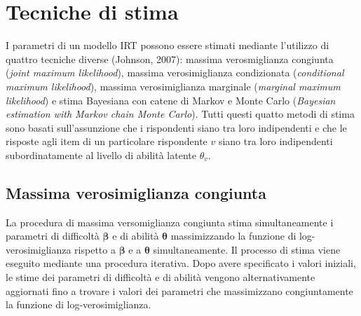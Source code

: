 

\section{Tecniche di stima}

I parametri di un modello IRT possono essere stimati mediante l'utilizzo di quattro tecniche diverse (Johnson, 2007): massima verosmiglianza congiunta ({\it joint maximum likelihood}), massima verosimiglianza condizionata ({\it conditional maximum likelihood}), massima verosimiglianza marginale ({\it marginal maximum likelihood}) e stima Bayesiana con catene di Markov e Monte Carlo ({\it Bayesian estimation with Markov chain Monte Carlo}).  Tutti questi quatto metodi di stima sono basati sull'assunzione che i rispondenti siano tra loro indipendenti e che le risposte agli item di un particolare rispondente $v$ siano tra loro indipendenti subordinatamente al livello di abilità latente $\theta_v$. 

\subsection{Massima verosimiglianza congiunta}\label{mv_congiunta}

La procedura di massima versomiglianza congiunta stima simultaneamente i  parametri di difficoltà $\boldsymbol{\beta}$ e di abilità $\boldsymbol{\theta}$ massimizzando la funzione di log-verosimiglianza  rispetto a $\boldsymbol{\beta}$ e a $\boldsymbol{\theta}$ simultaneamente. Il processo di stima viene eseguito mediante  una procedura iterativa. Dopo avere specificato i valori iniziali, le stime dei parametri di difficoltà e di abilità vengono alternativamente aggiornati fino a trovare i valori dei parametri che massimizzano congiuntamente la funzione di log-verosimiglianza.  

